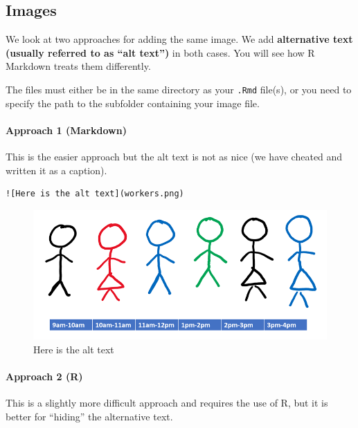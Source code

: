 \documentclass[
]{article}
\numberwithin{equation}{section}
\numberwithin{figure}{section}
\theoremstyle{break}
\theoremstyle{definition}
\theoremstyle{definition}
\theoremstyle{definition}
\theoremstyle{definition}
\theoremstyle{remark}
\begin{document}
\hypertarget{images}{%
\subsection{Images}\label{images}}

We look at two approaches for adding the same image. We add \textbf{alternative text (usually referred to as ``alt text'')} in both cases. You will see how R Markdown treats them differently.

The files must either be in the same directory as your \texttt{.Rmd} file(s), or you need to specify the path to the subfolder containing your image file.

\hypertarget{approach-1-markdown}{%
\paragraph*{Approach 1 (Markdown)}\label{approach-1-markdown}}

This is the easier approach but the alt text is not as nice (we have cheated and written it as a caption).

\begin{verbatim}
![Here is the alt text](workers.png)
\end{verbatim}

\begin{figure}
\centering
\includegraphics{workers.png}
\caption{Here is the alt text}
\end{figure}

\hypertarget{approach-2-r}{%
\paragraph*{Approach 2 (R)}\label{approach-2-r}}

This is a slightly more difficult approach and requires the use of R, but it is better for ``hiding'' the alternative text.
\end{document}
